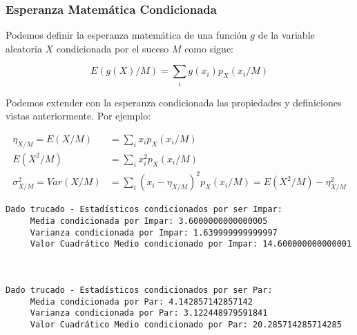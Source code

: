 \documentclass[11pt]{article}
\begin{document}
    \hypertarget{esperanza-matemuxe1tica-condicionada}{%
\subsubsection*{Esperanza Matemática
Condicionada}\label{esperanza-matemuxe1tica-condicionada}}

Podemos definir la esperanza matemática de una función \(g\) de la
variable aleatoria \(X\) condicionada por el suceso \(M\) como sigue:

\[E(g(X)/M)=\sum_i g(x_i)p_X(x_i/M)\]

Podemos extender con la esperanza condicionada las propiedades y
definiciones vistas anteriormente. Por ejemplo:

\begin{align*}
\eta_{X/M}=E(X/M)&=\sum_i x_ip_X(x_i/M)\\
E(X^2/M)&=\sum_i x_i^2p_X(x_i/M)\\
\sigma_{X/M}^2 = Var(X/M) &= \sum_i (x_i-\eta_{X/M})^2p_X(x_i/M) = E(X^2/M)-\eta_{X/M}^2
\end{align*}

    \begin{Verbatim}[commandchars=\\\{\}]
Dado trucado - Estadísticos condicionados por ser Impar:
	 Media condicionada por Impar: 3.6000000000000005
	 Varianza condicionada por Impar: 1.639999999999997
	 Valor Cuadrático Medio condicionado por Impar: 14.600000000000001



Dado trucado - Estadísticos condicionados por ser Par:
	 Media condicionada por Par: 4.142857142857142
	 Varianza condicionada por Par: 3.122448979591841
	 Valor Cuadrático Medio condicionado por Par: 20.285714285714285

    \end{Verbatim}


    
    
    
    
\end{document}
